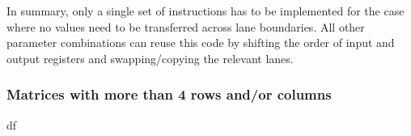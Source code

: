 In summary, only a single set of instructions has to be implemented for the case where no values need to be transferred across lane boundaries.
All other parameter combinations can reuse this code by shifting the order of input and output registers and swapping/copying the relevant lanes.




\subsubsection{Matrices with more than 4 rows and/or columns}
\label{sec:Implementation_general_multi_lane_matrices} 
df

